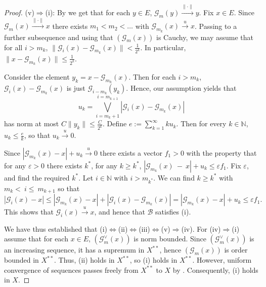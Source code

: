 \documentclass[12pt,leqno]{amsart}
\numberwithin{equation}{section}
\theoremstyle{definition}
\begin{document}
\begin{proof}
(v)$\Rightarrow$(i):  By \cite[Theorem 10.2.3, Lemma 10.2.5]{AK16} we get that for each $y\in E$, $\mathcal{G}_m(y)\xrightarrow{\|\cdot\|}y$. Fix $x\in E$.  Since $\mathcal{G}_m(x)\xrightarrow{\|\cdot\|}x$ there exists $m_1<m_2<\dots$ with $\mathcal{G}_{m_k}(x)\xrightarrow{u}x$.  Passing to a further subsequence and using that $(\mathcal{G}_m(x))$ is Cauchy, we may assume that for all $i>m_k$, $\|\mathcal{G}_i(x)-\mathcal{G}_{m_k}(x) \|<\frac{1}{2^k}$. In particular, $\|x-\mathcal{G}_{m_k}(x)\|\leq \frac{1}{2^k}$.
\medskip

Consider the element $y_k=x-\mathcal{G}_{m_k}(x)$. Then for each $i>m_k$, $\mathcal{G}_i(x)-\mathcal{G}_{m_k}(x)$ is just $\mathcal{G}_{i-m_k}(y_k)$. Hence, our assumption yields that $$u_k=\bigvee_{i=m_k+1}^{i=m_{k+1}}\left|\mathcal{G}_i(x)-\mathcal{G}_{m_k}(x)\right|$$ has norm at most $C\|y_k\|\leq \frac{C}{2^k}$. Define $e:=\sum_{k=1}^\infty ku_k$. Then for every $k\in \mathbb{N}$, $u_k\leq \frac{e}{k}$, so that $u_k\xrightarrow{u}0$.
\medskip

Since $|\mathcal{G}_{m_k}(x)-x|+u_k\xrightarrow{u}0$ there exists a vector $f_1>0$ with the property that for any $\varepsilon>0$ there exists $k^*$, for any $k\geq k^*$, $|\mathcal{G}_{m_k}(x)~-~x|+u_k\leq \varepsilon f_1$. Fix $\varepsilon$, and find the required $k^*$. Let $i \in \mathbb{N}$ with $i> m_{k^*}$. We can find $k\geq k^*$ with $m_k<~i\leq ~m_{k+1}$ so that
$$|\mathcal{G}_{i}(x)-x|\leq |\mathcal{G}_{m_k}(x)-x|+|\mathcal{G}_{i}(x)-\mathcal{G}_{m_k}(x)|=|\mathcal{G}_{m_k}(x)-x|+u_k\leq \varepsilon f_1.$$
This shows that $\mathcal{G}_{i}(x)\xrightarrow{u}x$, and hence that $\mathcal{B}$ satisfies (i).
\medskip

We have thus established that  (i)$\Leftrightarrow$(ii)$\Leftrightarrow$(iii)$\Leftrightarrow$(v)$\Rightarrow$(iv). For (iv)$\Rightarrow$(i) assume that for each $x\in E$, $(\mathcal{G}_m^\vee(x))$ is norm bounded. Since $(\mathcal{G}_m^\vee(x))$ is an increasing sequence, it has a supremum in $X^{**}$, hence $(\mathcal{G}_m(x))$ is order bounded in $X^{**}$. Thus, (ii) holds in $X^{**}$, so (i) holds in $X^{**}$. However, uniform convergence of sequences passes freely from $X^{**}$ to $X$ by \cite[Proposition 2.12]{TT19}. Consequently, (i) holds in $X$.
%
\end{proof}
\end{document}
